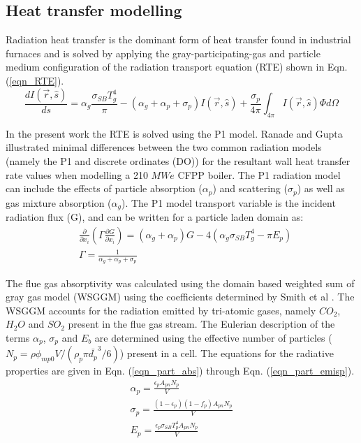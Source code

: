 \documentclass[11pt,cleanfoot]{asme2ej}
\begin{document}
\subsection{Heat transfer modelling}
Radiation heat transfer is the dominant form of heat transfer found in industrial furnaces \cite{Basu2000} and is solved by applying the gray-participating-gas and particle medium configuration of the radiation transport equation (RTE) \cite{Modest2013} shown in Eqn. (\ref{eqn_RTE}).
\begin{equation}\label{eqn_RTE}
\frac{d I(\vec{r},\hat{s})}{ds} = \alpha_g \frac{\sigma_{SB} T_{g}^4}{\pi}-(\alpha_g+\alpha_p+\sigma_p)I(\vec{r},\hat{s}) + \frac{\sigma_p}{4\pi}\int_{4\pi}I(\vec{r},\hat{s})\Phi d \Omega
\end{equation}

In the present work the RTE is solved using the P1 model. Ranade and Gupta \cite{Ranade2015} illustrated minimal differences between the two common radiation models (namely the P1 and discrete ordinates (DO)) for the resultant wall heat transfer rate values when modelling a 210 $MWe$ CFPP boiler. The P1 radiation model can include the effects of particle absorption ($\alpha_p$) and scattering ($\sigma_p$) as well as gas mixture absorption ($\alpha_g$). The P1 model transport variable is the incident radiation flux (G), and can be written for a particle laden domain as:
\begin{equation}
\begin{split}
&\frac{\partial}{\partial x_{i}}\left(\Gamma\frac{\partial G}{\partial x_{i}}\right)=\left(\alpha_g+\alpha_p\right)G-4\left(\alpha_g \sigma_{SB} T_{g}^4-\pi E_p \right)\\
&\Gamma = \frac{1}{\alpha_g+\alpha_p+\sigma_p}
\end{split}
\end{equation}

The flue gas absorptivity was calculated using the domain based weighted sum of gray gas model (WSGGM) using the coefficients determined by Smith et al \cite{Smith1982}. The WSGGM accounts for the radiation emitted by tri-atomic gases, namely $CO_2$, $H_2O$ and $SO_2$ present in the flue gas stream. The Eulerian description of the terms $\alpha_p$, $\sigma_p$ and $E_b$ are determined using the effective number of particles ($N_p = \rho \phi_{mp0} V / \left( \rho_p \pi \bar{d_p}^3 /6 \right)$) present in a cell. The equations for the radiative properties are given in Eqn. (\ref{eqn_part_abs}) through Eqn. (\ref{eqn_part_emisp}).
\begin{gather}
\alpha_p = \frac{\epsilon_p A_{pn}N_p}{V} \label{eqn_part_abs}\\
\sigma_p = \frac{(1-\epsilon_p)(1-f_p) A_{pn}N_p}{V} \label{eqn_part_scat} \\
E_p = \frac{\epsilon_p \sigma_{SB} T_p^4 A_{pn}N_p}{V}\label{eqn_part_emisp}
\end{gather}
\end{document}
